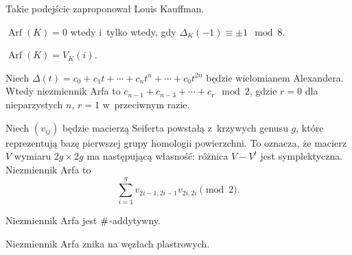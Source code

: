 Takie podejście zaproponował Louis Kauffman.

\begin{proposition}[Murasugi]
	$\operatorname{Arf}(K) = 0$ wtedy i~tylko wtedy, gdy $\Delta_K(-1) \equiv \pm 1 \mod 8$.
\end{proposition}

\begin{proposition}[Jones, 1985]
	$\operatorname{Arf}(K) = V_K(i)$.
\end{proposition}

\begin{proposition}[Robertello]
	Niech $ \Delta (t)=c_{0}+c_{1}t+\cdots +c_{n}t^{n}+\cdots +c_{0}t^{2n}$ będzie wielomianem Alexandera.
	Wtedy niezmiennik Arfa to $ c_{n-1}+c_{n-3}+\cdots +c_{r}\mod 2$, gdzie $r = 0$ dla nieparzystych $n$, $r = 1$ w~przeciwnym razie.
\end{proposition}

\begin{proposition}
	Niech $(v_{ij})$ będzie macierzą Seiferta powstałą z~krzywych genusu $g$, które reprezentują bazę pierwszej grupy homologii powierzchni.
	To oznacza, że macierz $V$ wymiaru $2g \times 2g$ ma następującą własność: różnica $V - V^t$ jest symplektyczna.
	Niezmiennik Arfa to
	\[
		\sum^g_{i=1}v_{2i-1,2i-1}v_{2i,2i} \pmod 2.
	\]
\end{proposition}

\begin{proposition}
	Niezmiennik Arfa jest $\mathbin{\#}$-addytywny.
\end{proposition}

\begin{proposition}
	Niezmiennik Arfa znika na węzłach plastrowych.
\end{proposition}



